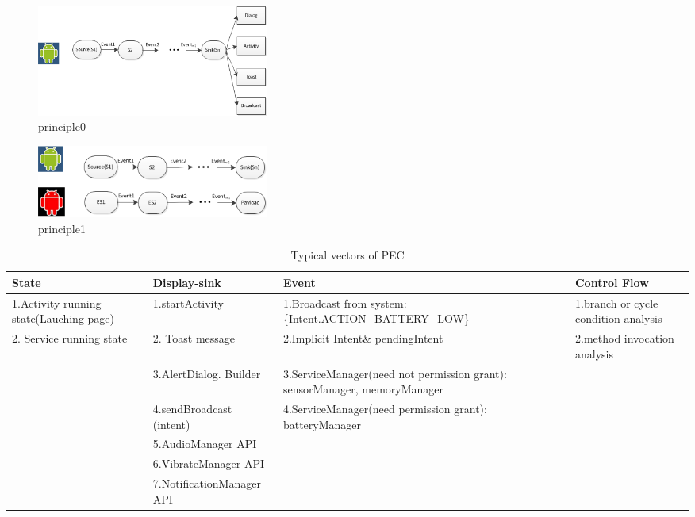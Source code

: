 \documentclass{sig-alternate-05-2015}
\begin{document}
\begin{figure}
\centering
\includegraphics[width = 3.0in]{principle0.png}
\caption{\label{} principle0}
\end{figure}

\begin{figure}
\centering
\includegraphics[width = 3.0in]{principle.png}
\caption{\label{}principle1}
\end{figure}



\begin{table}[htbp]
\centering
 \caption{\label{tab:test} Typical vectors of PEC}
 \begin{tabularx}{\linewidth}{XXXX}

  \toprule
  State & Display-sink & Event & Control Flow \\
  \midrule
 1.Activity running state(Lauching page) & 1.startActivity & 1.Broadcast from system: \{Intent.ACTION\_BATTERY\_LOW\} & 1.branch or cycle condition analysis \\
  2. Service running state &2. Toast message & 2.Implicit Intent\& pendingIntent & 2.method invocation analysis\\
     & 3.AlertDialog. Builder & 3.ServiceManager(need not permission grant): { sensorManager, memoryManager }\\
     & 4.sendBroadcast (intent)& 4.ServiceManager(need permission grant): { batteryManager }\\     
     & 5.AudioManager API & \\
     & 6.VibrateManager API & \\
     & 7.NotificationManager API & \\
     
  \bottomrule
 \end{tabularx}
\end{table}
\end{document}
